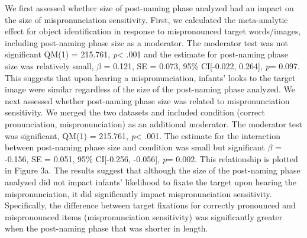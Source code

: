 \documentclass[man]{apa6}
\theoremstyle{definition}
\theoremstyle{definition}
\theoremstyle{definition}
\theoremstyle{remark}
\begin{document}
We first assessed whether size of post-naming phase analyzed had an
impact on the size of mispronunciation sensitivity. First, we calculated
the meta-analytic effect for object identification in response to
mispronounced target words/images, including post-naming phase size as a
moderator. The moderator test was not significant QM(1) = 215.761,
\emph{p}\textless{} .001 and the estimate for post-naming phase size was
relatively small, \(\beta\) = 0.121, SE = 0.073, 95\% CI{[}-0.022,
0.264{]}, \emph{p}= 0.097. This suggests that upon hearing a
mispronunciation, infants' looks to the target image were similar
regardless of the size of the post-naming phase analyzed. We next
assessed whether post-naming phase size was related to mispronunciation
sensitivity. We merged the two datasets and included condition (correct
pronunciation, mispronunciation) as an additional moderator. The
moderator test was significant, QM(1) = 215.761, \emph{p}\textless{}
.001. The estimate for the interaction between post-naming phase size
and condition was small but significant \(\beta\) = -0.156, SE = 0.051,
95\% CI{[}-0.256, -0.056{]}, \emph{p}= 0.002. This relationship is
plotted in Figure 3a. The results suggest that although the size of the
post-naming phase analyzed did not impact infants' likelihood to fixate
the target upon hearing the mispronunciation, it did significantly
impact mispronunciation sensitivity. Specifically, the difference
between target fixations for correctly pronounced and mispronounced
items (mispronunciation sensitivity) was significantly greater when the
post-naming phase that was shorter in length.
\end{document}
